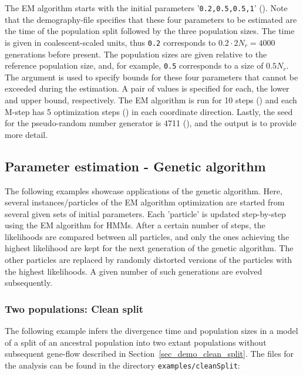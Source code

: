 \documentclass{article}
\numberwithin{equation}{section}
\begin{document}
The EM algorithm starts with the initial parameters '\texttt{0.2,0.5,0.5,1}' (). Note that the demography-file specifies that these four parameters to be estimated are the time of the population split followed by the three population sizes. The time is given in coalescent-scaled units, thus \texttt{0.2} corresponds to $0.2 \cdot 2 N_r = 4000$ generations before present. The population sizes are given relative to the reference population size, and, for example, \texttt{0.5} corresponds to a size of $0.5 N_r$. The argument  is used to specify bounds for these four parameters that cannot be exceeded during the estimation. A pair of values is specified for each, the lower and upper bound, respectively. The EM algorithm is run for 10 steps () and each M-step has 5 optimization steps () in each coordinate direction. Lastly, the seed for the pseudo-random number generator is 4711 (), and the output is  to provide more detail.

\subsection{Parameter estimation - Genetic algorithm}
\label{sec_examples_genetic}

The following examples showcase applications of the genetic algorithm. Here, several instances/particles of the EM algorithm optimization are started from several given sets of initial parameters. Each 'particle' is updated step-by-step using the EM algorithm for HMMs. After a certain number of steps, the likelihoods are compared between all particles, and only the ones achieving the highest likelihood are kept for the next generation of the genetic algorithm. The other particles are replaced by randomly distorted versions of the particles with the highest likelihoods. A given number of such generations are evolved subsequently.

\subsubsection{Two populations: Clean split}

The following example infers the divergence time and population sizes in a model of a split of an ancestral population into two extant populations without subsequent gene-flow described in Section~\ref{sec_demo_clean_split}. The files for the analysis can be found in the directory \texttt{examples/cleanSplit}:
\end{document}
